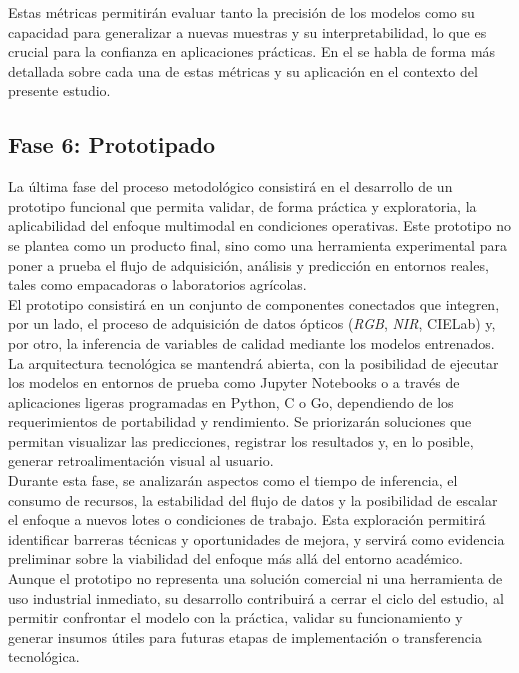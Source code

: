 Estas métricas permitirán evaluar tanto la precisión de los modelos como su capacidad para generalizar a nuevas muestras y su interpretabilidad, lo que es crucial para la confianza en aplicaciones prácticas. En el  se habla de forma más detallada sobre cada una de estas métricas y su aplicación en el contexto del presente estudio.

\subsection{Fase 6: Prototipado}

La última fase del proceso metodológico consistirá en el desarrollo de un prototipo funcional que permita validar, de forma práctica y exploratoria, la aplicabilidad del enfoque multimodal en condiciones operativas. Este prototipo no se plantea como un producto final, sino como una herramienta experimental para poner a prueba el flujo de adquisición, análisis y predicción en entornos reales, tales como empacadoras o laboratorios agrícolas.\\

El prototipo consistirá en un conjunto de componentes conectados que integren, por un lado, el proceso de adquisición de datos ópticos (\textit{RGB}, \textit{NIR}, CIELab) y, por otro, la inferencia de variables de calidad mediante los modelos entrenados. La arquitectura tecnológica se mantendrá abierta, con la posibilidad de ejecutar los modelos en entornos de prueba como Jupyter Notebooks o a través de aplicaciones ligeras programadas en Python, C o Go, dependiendo de los requerimientos de portabilidad y rendimiento. Se priorizarán soluciones que permitan visualizar las predicciones, registrar los resultados y, en lo posible, generar retroalimentación visual al usuario.\\

Durante esta fase, se analizarán aspectos como el tiempo de inferencia, el consumo de recursos, la estabilidad del flujo de datos y la posibilidad de escalar el enfoque a nuevos lotes o condiciones de trabajo. Esta exploración permitirá identificar barreras técnicas y oportunidades de mejora, y servirá como evidencia preliminar sobre la viabilidad del enfoque más allá del entorno académico.\\

Aunque el prototipo no representa una solución comercial ni una herramienta de uso industrial inmediato, su desarrollo contribuirá a cerrar el ciclo del estudio, al permitir confrontar el modelo con la práctica, validar su funcionamiento y generar insumos útiles para futuras etapas de implementación o transferencia tecnológica.